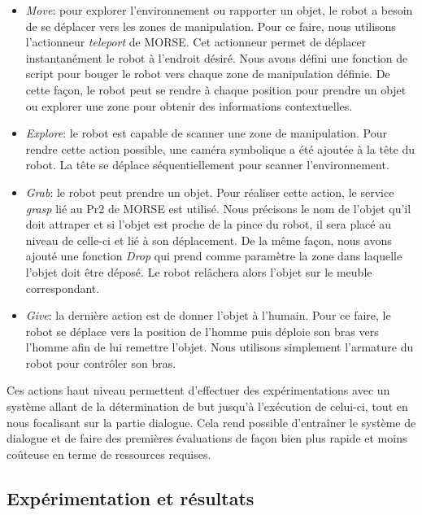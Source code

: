 \documentclass[a4paper,11pt,twoside]{StyleThese}
\begin{document}
\begin{itemize}

\item \textit{Move}: pour explorer l'environnement ou rapporter un objet, le robot a besoin de se déplacer vers les zones de manipulation. Pour ce faire, nous utilisons l'actionneur \textit{teleport} de MORSE. Cet actionneur permet de déplacer instantanément le robot à l'endroit désiré. Nous avons défini une fonction de script pour bouger le robot vers chaque zone de manipulation définie. De cette façon, le robot peut se rendre à chaque position pour prendre un objet ou explorer une zone pour obtenir des informations contextuelles.

\item \textit{Explore}: le robot est capable de scanner une zone de manipulation. Pour rendre cette action possible, une caméra symbolique a été ajoutée à la tête du robot. La tête se déplace séquentiellement pour scanner l'environnement.

\item \textit{Grab}: le robot peut prendre un objet. Pour réaliser cette action, le service \textit{grasp} lié au Pr2 de MORSE est utilisé. Nous précisons le nom de l'objet qu'il doit attraper et si l'objet est proche de la pince du robot, il sera placé au niveau de celle-ci et lié à son déplacement. De la même façon, nous avons ajouté une fonction \textit{Drop} qui prend comme paramètre la zone dans laquelle l'objet doit être déposé. Le robot relâchera alors l'objet sur le meuble correspondant.

\item \textit{Give}: la dernière action est de donner l'objet à l'humain. Pour ce faire, le robot se déplace vers la position de l'homme puis déploie son bras vers l'homme afin de lui remettre l'objet. Nous utilisons simplement l'armature du robot pour contrôler son bras.
\end{itemize}

Ces actions haut niveau permettent d'effectuer des expérimentations avec un système allant de la détermination de but jusqu'à l'exécution de celui-ci, tout en nous focalisant sur la partie dialogue. Cela rend possible d'entraîner le système de dialogue et de faire des premières évaluations de façon bien plus rapide et moins coûteuse en terme de ressources requises.

\subsection{Expérimentation et résultats}
\end{document}

